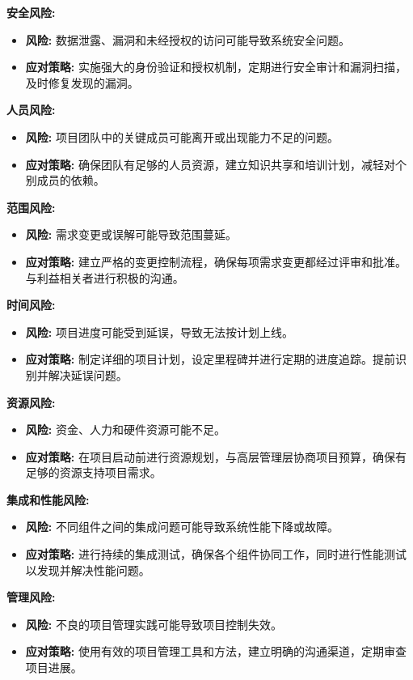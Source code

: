 \documentclass{article}
\begin{document}
\textbf{安全风险:}
\begin{itemize}
    \item \textbf{风险:} 数据泄露、漏洞和未经授权的访问可能导致系统安全问题。
    \item \textbf{应对策略:} 实施强大的身份验证和授权机制，定期进行安全审计和漏洞扫描，及时修复发现的漏洞。
\end{itemize}

\textbf{人员风险:}
\begin{itemize}
    \item \textbf{风险:} 项目团队中的关键成员可能离开或出现能力不足的问题。
    \item \textbf{应对策略:} 确保团队有足够的人员资源，建立知识共享和培训计划，减轻对个别成员的依赖。
\end{itemize}

\textbf{范围风险:}
\begin{itemize}
    \item \textbf{风险:} 需求变更或误解可能导致范围蔓延。
    \item \textbf{应对策略:} 建立严格的变更控制流程，确保每项需求变更都经过评审和批准。与利益相关者进行积极的沟通。
\end{itemize}

\textbf{时间风险:}
\begin{itemize}
    \item \textbf{风险:} 项目进度可能受到延误，导致无法按计划上线。
    \item \textbf{应对策略:} 制定详细的项目计划，设定里程碑并进行定期的进度追踪。提前识别并解决延误问题。
\end{itemize}

\textbf{资源风险:}
\begin{itemize}
    \item \textbf{风险:} 资金、人力和硬件资源可能不足。
    \item \textbf{应对策略:} 在项目启动前进行资源规划，与高层管理层协商项目预算，确保有足够的资源支持项目需求。
\end{itemize}

\textbf{集成和性能风险:}
\begin{itemize}
    \item \textbf{风险:} 不同组件之间的集成问题可能导致系统性能下降或故障。
    \item \textbf{应对策略:} 进行持续的集成测试，确保各个组件协同工作，同时进行性能测试以发现并解决性能问题。
\end{itemize}

\textbf{管理风险:}
\begin{itemize}
    \item \textbf{风险:} 不良的项目管理实践可能导致项目控制失效。
    \item \textbf{应对策略:} 使用有效的项目管理工具和方法，建立明确的沟通渠道，定期审查项目进展。
\end{itemize}
\end{document}
